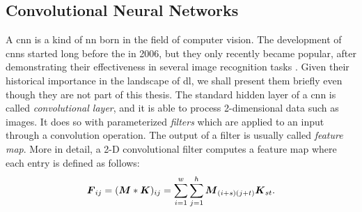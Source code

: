 \subsection{Convolutional Neural Networks}
A \gls{cnn} \citep{lecun1995convolutionalnn} is a kind of \gls{nn} born in the field of computer vision. The development of \glspl{cnn} started long before the  in 2006, but they only recently became popular, after demonstrating their effectiveness in several image recognition tasks \citep{krizhevsky2017imagenet}. Given their historical importance in the landscape of \gls{dl}, we shall present them briefly even though they are not part of this thesis. The standard hidden layer of a \gls{cnn} is called \emph{convolutional layer}, and it is able to process 2-dimensional data such as images. It does so with parameterized \emph{filters} which are applied to an input through a convolution operation. The output of a filter is usually called \emph{feature map}. More in detail, a 2-D convolutional filter computes a feature map where each entry is defined as follows:
$$\Matrix{F}_{ij} = (\Matrix{M} * \Matrix{K})_{ij} = \sum_{i=1}^{w} \sum_{j=1}^{h} \Matrix{M}_{(i+s)(j+t)}\Matrix{K}_{st}.$$
